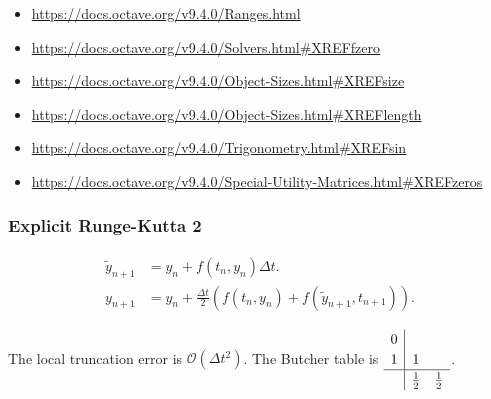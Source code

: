 \begin{itemize}
	\item

	      \url{https://docs.octave.org/v9.4.0/Ranges.html}

	\item

	      \url{https://docs.octave.org/v9.4.0/Solvers.html#XREFfzero}

	\item

	      \url{https://docs.octave.org/v9.4.0/Object-Sizes.html#XREFsize}

	\item

	      \url{https://docs.octave.org/v9.4.0/Object-Sizes.html#XREFlength}

	\item

	      \url{https://docs.octave.org/v9.4.0/Trigonometry.html#XREFsin}

	\item

	      \url{https://docs.octave.org/v9.4.0/Special-Utility-Matrices.html#XREFzeros}
\end{itemize}


\subsubsection{Explicit Runge-Kutta 2}
\begin{align*}
	\widetilde{y}_{n+1} & =
	y_{n}+
	f\left(t_{n},y_{n}\right)\Delta t. \\
	y_{n+1}             & =
	y_{n}+
	\frac{\Delta t}{2}
	\left(
	f\left(t_{n},y_{n}\right)+
	f\left(\widetilde{y}_{n+1},t_{n+1}\right)
	\right).
\end{align*}

The local truncation error is
\begin{math}
	\mathcal{O}
	\left(\Delta t^{2}\right)
\end{math}.
The Butcher table is
\begin{math}
	\renewcommand\arraystretch{1.2}
	\begin{array}
		{c|cc}
		0 &             &             \\
		1 & 1           &             \\
		\hline
		  & \frac{1}{2} & \frac{1}{2}
	\end{array}
\end{math}.


